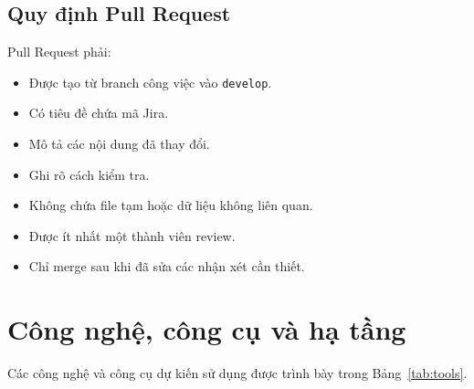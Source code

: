 \subsection{Quy định Pull Request}

Pull Request phải:

\begin{itemize}
	\item Được tạo từ branch công việc vào \texttt{develop}.
	\item Có tiêu đề chứa mã Jira.
	\item Mô tả các nội dung đã thay đổi.
	\item Ghi rõ cách kiểm tra.
	\item Không chứa file tạm hoặc dữ liệu không liên quan.
	\item Được ít nhất một thành viên review.
	\item Chỉ merge sau khi đã sửa các nhận xét cần thiết.
\end{itemize}

\section{Công nghệ, công cụ và hạ tầng}

Các công nghệ và công cụ dự kiến sử dụng được trình bày trong
Bảng~\ref{tab:tools}.

